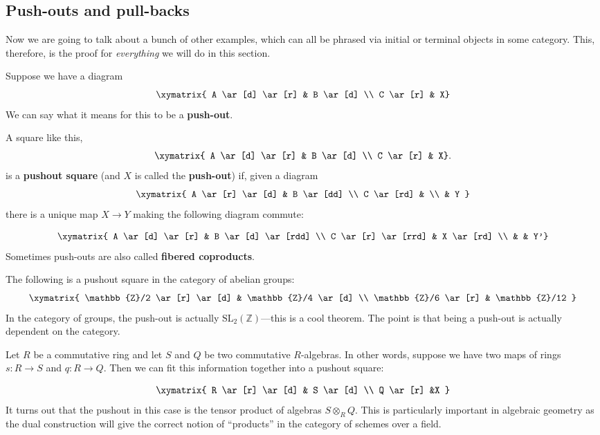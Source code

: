 \subsection{Push-outs and pull-backs}

Now we are going to talk about a bunch of other examples, which can all be
phrased via initial or terminal objects in some category. This,
therefore, is the proof for \emph{everything} we will do in this section.

Suppose we have a diagram
\[
\xymatrix{
A \ar[d] \ar[r] &  B \ar[d] \\
C \ar[r] &  X}
\]
We can say what it means for this to be a \textbf{push-out}.

\begin{definition}
A square like this,
\[
\xymatrix{
A \ar[d] \ar[r] &  B \ar[d] \\
C \ar[r] &  X}.
\]
is a \textbf{pushout square} (and $X$ is called the \textbf{push-out}) if,
given a diagram
\[ \xymatrix{
A \ar[r] \ar[d]  &  B \ar[dd] \\
C \ar[rd] & \\
& Y
}\]
there is a unique map $X \to Y$ making the following diagram commute:

\[
\xymatrix{
A \ar[d] \ar[r] &  B \ar[d] \ar[rdd] \\
C \ar[r] \ar[rrd] &  X \ar[rd] \\
& & Y'}
\]
Sometimes push-outs are also called \textbf{fibered coproducts}.
\end{definition}

\begin{example}
The following is a pushout square in the category of abelian groups:
\[ \xymatrix{
\mathbb{Z}/2 \ar[r] \ar[d]  &  \mathbb{Z}/4 \ar[d]  \\
\mathbb{Z}/6 \ar[r] &  \mathbb{Z}/12
}\]
In the category of groups, the push-out is actually
$\mathrm{SL}_2(\mathbb{Z})$---this is a cool theorem. The point is that being a
push-out is actually dependent on the category.
\end{example}

\begin{example}
Let $R$ be a commutative ring and let $S$ and $Q$ be two commutative
$R$-algebras. In other words, suppose
we have two maps of rings $s:R\rightarrow S$ and $q:R\rightarrow Q$. Then we
can fit this information together
into a pushout square:

\[ \xymatrix{
R \ar[r] \ar[d]  &  S \ar[d]   \\
Q \ar[r] &X
}\]
It turns out that the pushout in this case is the tensor product of algebras
$S\otimes_R Q$. This is particularly important
in algebraic geometry as the dual construction will give the correct notion of
``products'' in the category of schemes over
a field.\end{example}

